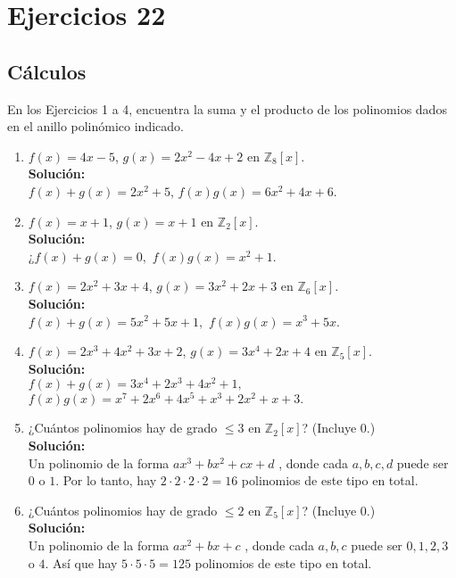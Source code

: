 \section*{Ejercicios 22}

\subsection*{Cálculos}
\noindent
En los Ejercicios 1 a 4, encuentra la suma y el producto de los polinomios dados en el anillo polinómico indicado.
\begin{enumerate}
	\item $f(x) = 4x - 5$, $g(x) = 2x^2 - 4x + 2$ en $\mathbb{Z}_8[x]$.
	\\ \textbf{Solución:} \\
	$f(x) + g(x) = 2x^2 + 5$, \quad $f(x)g(x) = 6x^2 + 4x + 6.$
	\item $f(x) = x + 1$, $g(x) = x + 1$ en $\mathbb{Z}_2[x]$.
	\\ \textbf{Solución:} \\
	¿$f(x) + g(x) = 0,$ \quad $f(x)g(x) = x^2 + 1.$
	\item $f(x) = 2x^2 + 3x + 4$, $g(x) = 3x^2 + 2x + 3$ en $\mathbb{Z}_6[x]$.
	\\ \textbf{Solución:} \\
	$f(x) + g(x) = 5x^2 + 5x + 1,$ \quad $f(x)g(x) = x^3 + 5x.$
	\item $f(x) = 2x^3 + 4x^2 + 3x + 2$, $g(x) = 3x^4 + 2x + 4$ en $\mathbb{Z}_5[x]$.
	\\ \textbf{Solución:} \\
	$f(x) + g(x) = 3x^4 + 2x^3 + 4x^2 + 1,$ \\
	$f(x)g(x) = x^7 + 2x^6 + 4x^5 + x^3 + 2x^2 + x + 3.$
	
	\item ¿Cuántos polinomios hay de grado $\leq 3$ en $\mathbb{Z}_2[x]$? (Incluye 0.)
	\\ \textbf{Solución:} \\
	Un polinomio de la forma  $ax^3 + bx^2 + cx + d$ , donde cada $a, b, c, d$  puede ser  $0$  o  $1$. 
	Por lo tanto, hay  $2 \cdot 2 \cdot 2 \cdot 2 = 16$  polinomios de este tipo en total.
	\item ¿Cuántos polinomios hay de grado $\leq 2$ en $\mathbb{Z}_5[x]$? (Incluye 0.)
	\\ \textbf{Solución:} \\
	Un polinomio de la forma  $ax^2 + bx + c$ , donde cada $a, b, c$  puede ser  $0, 1, 2, 3$  o  $4.$
	Así que hay $5 \cdot 5 \cdot 5 = 125$  polinomios de este tipo en total.
\end{enumerate}

